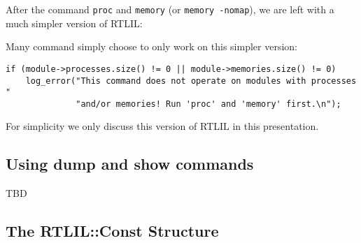 \begin{frame}[fragile]{\subsecname}
After the command {\tt proc} and {\tt memory} (or {\tt memory -nomap}), we are left with a much simpler version of RTLIL:

\begin{center}
\end{center}

\bigskip
Many command simply choose to only work on this simpler version:
\begin{lstlisting}[xleftmargin=0.5cm, basicstyle=\ttfamily\fontsize{8pt}{10pt}\selectfont]
if (module->processes.size() != 0 || module->memories.size() != 0)
    log_error("This command does not operate on modules with processes "
              "and/or memories! Run 'proc' and 'memory' first.\n");
\end{lstlisting}

\bigskip
For simplicity we only discuss this version of RTLIL in this presentation.
\end{frame}


\subsection{Using dump and show commands}

\begin{frame}{\subsecname}
TBD
\end{frame}


\subsection{The RTLIL::Const Structure}

